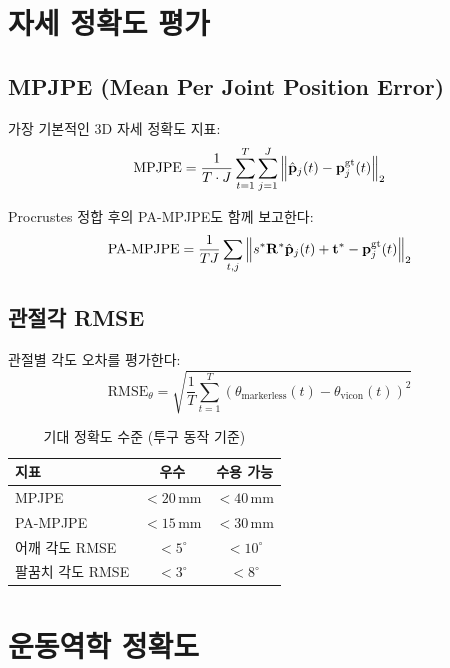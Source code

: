 \documentclass[11pt, a4paper]{report}
\begin{document}
\section{자세 정확도 평가}

\subsection{MPJPE (Mean Per Joint Position Error)}

가장 기본적인 3D 자세 정확도 지표:
\begin{equation}
  \text{MPJPE} = \frac{1}{T \cdot J} \sum_{t=1}^{T}\sum_{j=1}^{J} \left\| \hat{\mathbf{p}}_j(t) - \mathbf{p}_j^{\text{gt}}(t) \right\|_2
\end{equation}

Procrustes 정합 후의 PA-MPJPE도 함께 보고한다:
\begin{equation}
  \text{PA-MPJPE} = \frac{1}{TJ} \sum_{t,j} \left\| s^*\mathbf{R}^*\hat{\mathbf{p}}_j(t) + \mathbf{t}^* - \mathbf{p}_j^{\text{gt}}(t) \right\|_2
\end{equation}

\subsection{관절각 RMSE}

관절별 각도 오차를 평가한다:
\begin{equation}
  \text{RMSE}_{\theta} = \sqrt{\frac{1}{T}\sum_{t=1}^{T} \left(\theta_{\text{markerless}}(t) - \theta_{\text{vicon}}(t)\right)^2}
\end{equation}

\begin{table}[H]
\centering
\caption{기대 정확도 수준 (투구 동작 기준)}
\begin{tabular}{lcc}
\toprule
\textbf{지표} & \textbf{우수} & \textbf{수용 가능} \\
\midrule
MPJPE & $< 20$\,mm & $< 40$\,mm \\
PA-MPJPE & $< 15$\,mm & $< 30$\,mm \\
어깨 각도 RMSE & $< 5^\circ$ & $< 10^\circ$ \\
팔꿈치 각도 RMSE & $< 3^\circ$ & $< 8^\circ$ \\
\bottomrule
\end{tabular}
\end{table}

\section{운동역학 정확도}
\end{document}
